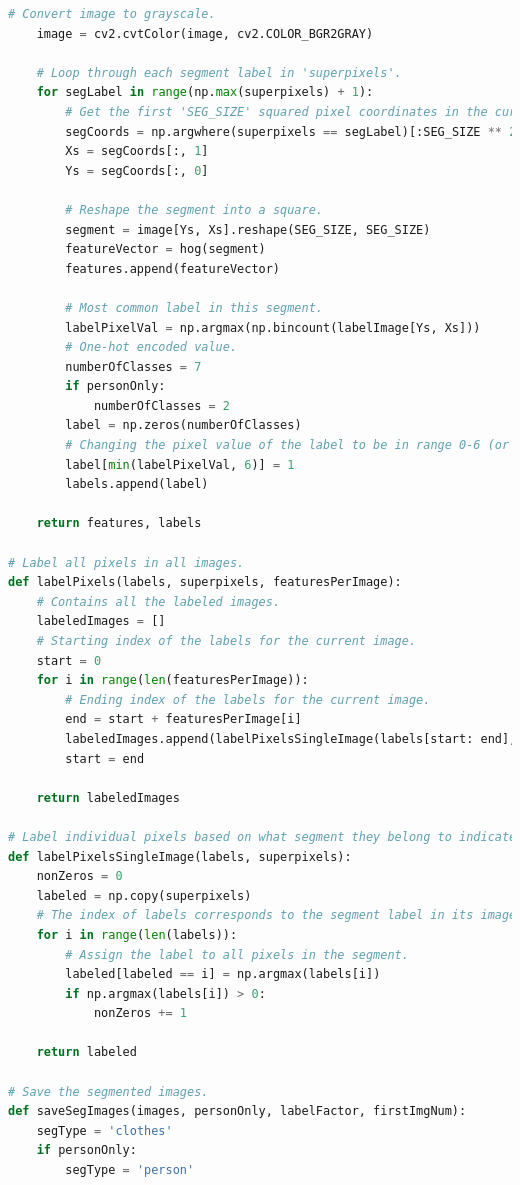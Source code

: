 \documentclass{csc_assignment5}
\begin{document}
\begin{description}
\begin{lstlisting}[language=Python]
    # Convert image to grayscale.
    image = cv2.cvtColor(image, cv2.COLOR_BGR2GRAY)
    
    # Loop through each segment label in 'superpixels'.
    for segLabel in range(np.max(superpixels) + 1):
        # Get the first 'SEG_SIZE' squared pixel coordinates in the current segment (y, x).
        segCoords = np.argwhere(superpixels == segLabel)[:SEG_SIZE ** 2]
        Xs = segCoords[:, 1]
        Ys = segCoords[:, 0]

        # Reshape the segment into a square.
        segment = image[Ys, Xs].reshape(SEG_SIZE, SEG_SIZE)
        featureVector = hog(segment)
        features.append(featureVector)
        
        # Most common label in this segment.
        labelPixelVal = np.argmax(np.bincount(labelImage[Ys, Xs]))
        # One-hot encoded value.
        numberOfClasses = 7
        if personOnly:
            numberOfClasses = 2
        label = np.zeros(numberOfClasses)
        # Changing the pixel value of the label to be in range 0-6 (or 0-1).
        label[min(labelPixelVal, 6)] = 1
        labels.append(label)
        
    return features, labels

# Label all pixels in all images.      
def labelPixels(labels, superpixels, featuresPerImage):
    # Contains all the labeled images.
    labeledImages = []
    # Starting index of the labels for the current image.
    start = 0
    for i in range(len(featuresPerImage)):
        # Ending index of the labels for the current image.
        end = start + featuresPerImage[i]
        labeledImages.append(labelPixelsSingleImage(labels[start: end], superpixels[i]))
        start = end
    
    return labeledImages

# Label individual pixels based on what segment they belong to indicated by 'superpixels'. 
def labelPixelsSingleImage(labels, superpixels):
    nonZeros = 0
    labeled = np.copy(superpixels)
    # The index of labels corresponds to the segment label in its image.
    for i in range(len(labels)):
        # Assign the label to all pixels in the segment.
        labeled[labeled == i] = np.argmax(labels[i])
        if np.argmax(labels[i]) > 0:
            nonZeros += 1
     
    return labeled

# Save the segmented images.
def saveSegImages(images, personOnly, labelFactor, firstImgNum):
    segType = 'clothes'
    if personOnly:
        segType = 'person'
    

\end{lstlisting}
\end{description}
\end{document}
